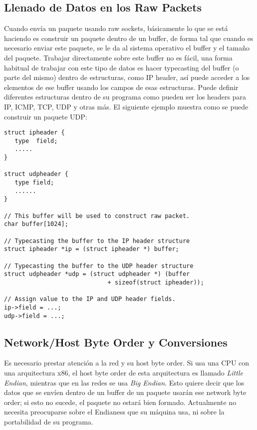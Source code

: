 \subsection{Llenado de Datos en los Raw Packets}

Cuando envía un paquete usando raw sockets, básicamente lo que se está haciendo es construir un paquete dentro de un buffer, de forma tal que cuando es necesario enviar este paquete, se le da al sistema operativo el buffer y el tamaño del paquete. 
Trabajar directamente sobre este buffer no es fácil, una forma habitual de trabajar con este tipo de datos es hacer typecasting del buffer (o parte del mismo) dentro de estructuras, como IP header, así puede acceder a los elementos de ese buffer usando los campos de esas estructuras.
Puede definir diferentes estructuras dentro de su programa como pueden ser los headers para IP, ICMP, TCP, UDP y otras más. El siguiente ejemplo muestra como se puede construir un paquete UDP:

\begin{lstlisting}
struct ipheader {
   type  field;
   .....
}

struct udpheader {
   type field;
   ......
}

// This buffer will be used to construct raw packet.
char buffer[1024];

// Typecasting the buffer to the IP header structure
struct ipheader *ip = (struct ipheader *) buffer;

// Typecasting the buffer to the UDP header structure
struct udpheader *udp = (struct udpheader *) (buffer
                             + sizeof(struct ipheader));

// Assign value to the IP and UDP header fields.
ip->field = ...;
udp->field = ...;
\end{lstlisting}



\subsection{Network/Host Byte Order y Conversiones}

Es necesario prestar atención a la red y su host byte order. Si usa una CPU con una arquitectura x86, el host byte order de esta arquitectura es llamado {\em Little Endian}, mientras que en las redes se usa {\em Big Endian}. Esto quiere decir que los datos que se envíen dentro de un buffer de un paquete usarán ese network byte order; si esto no sucede, el paquete no estará bien formado. Actualmente no necesita preocuparse sobre el Endianess que su máquina usa, ni sobre la portabilidad de su programa.

